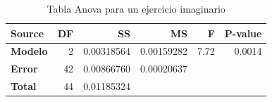 \begin{table}[htb]
  \begin{center}
    \begin{tabular}{l | r r r r r}
      \toprule
      Source & \textbf{DF} & \textbf{SS} & \textbf{MS} & \textbf{F} & \textbf{P-value} \\
      \midrule
      \textbf{Modelo} & 2 & 0.00318564 & 0.00159282 & 7.72 & 0.0014 \\
      \textbf{Error} & 42 & 0.00866760 & 0.00020637 &  & \\
      \midrule
      \textbf{Total} & 44 & 0.01185324 &   &  & \\
      \bottomrule
    \end{tabular}
  \end{center}
\caption{Tabla Anova para un ejercicio imaginario}
\label{tab:exey}
\end{table}
